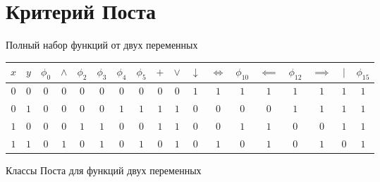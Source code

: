 \documentclass[12pt,a4paper]{article}
\theoremstyle{plain}
\theoremstyle{definition}
\theoremstyle{remark}
\numberwithin{equation}{section}
\begin{document}
\section{Критерий Поста}

\noindent Полный набор функций от двух переменных

\vspace{0.5em}

\noindent\begin{tabularx}{\linewidth}{|C|C|C|C|C|C|C|C|C|C|C|c|C|c|C|c|C|C|}
  \hline
  $x$ & $y$ & $\phi_0$ & $\land$ & $\phi_2$ & $\phi_3$ & $\phi_4$ & $\phi_5$ & $+$ & $\lor$ & $\downarrow$ & $\iff$ & $\phi_{10}$ & $\impliedby$ & $\phi_{12}$ & $\implies$ & $|$ & $\phi_{15}$ \\
  \hline
  $0$ & $0$ & $0$ & $0$ & $0$ & $0$ & $0$ & $0$ & $0$ & $0$ & $1$ & $1$ & $1$ & $1$ & $1$ & $1$ & $1$ & $1$ \\
  $0$ & $1$ & $0$ & $0$ & $0$ & $0$ & $1$ & $1$ & $1$ & $1$ & $0$ & $0$ & $0$ & $0$ & $1$ & $1$ & $1$ & $1$ \\
  $1$ & $0$ & $0$ & $0$ & $1$ & $1$ & $0$ & $0$ & $1$ & $1$ & $0$ & $0$ & $1$ & $1$ & $0$ & $0$ & $1$ & $1$ \\
  $1$ & $1$ & $0$ & $1$ & $0$ & $1$ & $0$ & $1$ & $0$ & $1$ & $0$ & $1$ & $0$ & $1$ & $0$ & $1$ & $0$ & $1$ \\
  \hline
\end{tabularx} 

\vspace{0.5em}

\noindent Классы Поста для функций двух переменных

\vspace{0.5em}
\end{document}
